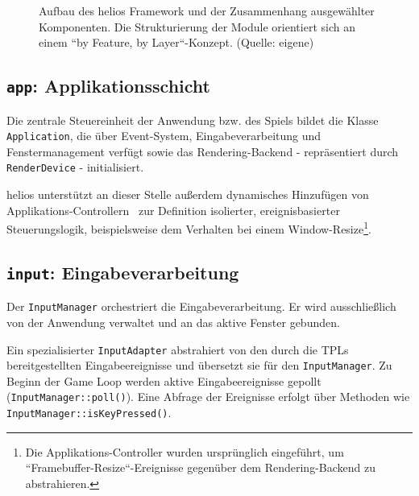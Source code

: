 \begin{figure}[t]
    \centering
    \caption{Aufbau des helios Framework und der Zusammenhang ausgewählter Komponenten. Die Strukturierung der Module orientiert sich an einem ``by Feature, by Layer``-Konzept. (Quelle: eigene)}

    \label{fig:package_diagram}

\end{figure}


\subsection*{\texttt{app}: Applikationsschicht}
Die zentrale Steuereinheit der Anwendung bzw. des Spiels bildet die Klasse \texttt{Application}, die über Event-System, Eingabeverarbeitung und Fenstermanagement verfügt sowie das Rendering-Backend - repräsentiert durch \texttt{RenderDevice} - initialisiert.\par
helios unterstützt an dieser Stelle außerdem dynamisches Hinzufügen von Applikations-Controllern~\cite[379]{Fow03} zur Definition isolierter, ereignisbasierter Steuerungslogik, beispielsweise dem Verhalten bei einem Window-Resize\footnote{
Die Applikations-Controller wurden ursprünglich eingeführt, um ``Framebuffer-Resize``-Ereignisse gegenüber dem Rendering-Backend zu abstrahieren.
}.

\subsection*{\texttt{input}: Eingabeverarbeitung}
Der \texttt{InputManager} orchestriert die Eingabeverarbeitung.
Er wird ausschließlich von der Anwendung verwaltet und an das aktive Fenster gebunden.\par
Ein spezialisierter \texttt{InputAdapter} abstrahiert von den durch die TPLs bereitgestellten Eingabeereignisse und übersetzt sie für den \texttt{InputManager}.
Zu Beginn der Game Loop werden aktive Eingabeereignisse gepollt (\texttt{InputManager::poll()}). Eine Abfrage der Ereignisse erfolgt über Methoden wie \texttt{InputManager::isKeyPressed()}.

